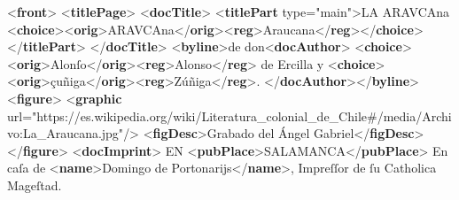 \documentclass[
]{book}
\newenvironment{Shaded}{\begin{snugshade}}{\end{snugshade}}
\newcommand{\KeywordTok}[1]{\textcolor[rgb]{0.13,0.29,0.53}{\textbf{#1}}}
\newcommand{\NormalTok}[1]{#1}
\newcommand{\OtherTok}[1]{\textcolor[rgb]{0.56,0.35,0.01}{#1}}
\newcommand{\StringTok}[1]{\textcolor[rgb]{0.31,0.60,0.02}{#1}}
\begin{document}
\begin{Shaded}
\begin{Highlighting}[]
\NormalTok{\textless{}}\KeywordTok{front}\NormalTok{\textgreater{}}
\NormalTok{  \textless{}}\KeywordTok{titlePage}\NormalTok{\textgreater{}}
\NormalTok{    \textless{}}\KeywordTok{docTitle}\NormalTok{\textgreater{}}
\NormalTok{      \textless{}}\KeywordTok{titlePart}\OtherTok{ type=}\StringTok{"main"}\NormalTok{\textgreater{}LA ARAVCAna \textless{}}\KeywordTok{choice}\NormalTok{\textgreater{}\textless{}}\KeywordTok{orig}\NormalTok{\textgreater{}ARAVCAna\textless{}/}\KeywordTok{orig}\NormalTok{\textgreater{}\textless{}}\KeywordTok{reg}\NormalTok{\textgreater{}Araucana\textless{}/}\KeywordTok{reg}\NormalTok{\textgreater{}\textless{}/}\KeywordTok{choice}\NormalTok{\textgreater{}}
\NormalTok{      \textless{}/}\KeywordTok{titlePart}\NormalTok{\textgreater{}}
\NormalTok{    \textless{}/}\KeywordTok{docTitle}\NormalTok{\textgreater{}}
\NormalTok{    \textless{}}\KeywordTok{byline}\NormalTok{\textgreater{}de don\textless{}}\KeywordTok{docAuthor}\NormalTok{\textgreater{}}
\NormalTok{    \textless{}}\KeywordTok{choice}\NormalTok{\textgreater{}\textless{}}\KeywordTok{orig}\NormalTok{\textgreater{}Alonſo\textless{}/}\KeywordTok{orig}\NormalTok{\textgreater{}\textless{}}\KeywordTok{reg}\NormalTok{\textgreater{}Alonso\textless{}/}\KeywordTok{reg}\NormalTok{\textgreater{} }
\NormalTok{    de Ercilla y \textless{}}\KeywordTok{choice}\NormalTok{\textgreater{}\textless{}}\KeywordTok{orig}\NormalTok{\textgreater{}çuñiga\textless{}/}\KeywordTok{orig}\NormalTok{\textgreater{}\textless{}}\KeywordTok{reg}\NormalTok{\textgreater{}Zúñiga\textless{}/}\KeywordTok{reg}\NormalTok{\textgreater{}.}
\NormalTok{    \textless{}/}\KeywordTok{docAuthor}\NormalTok{\textgreater{}\textless{}/}\KeywordTok{byline}\NormalTok{\textgreater{} }
\NormalTok{    \textless{}}\KeywordTok{figure}\NormalTok{\textgreater{}}
\NormalTok{      \textless{}}\KeywordTok{graphic}\OtherTok{ url=}\StringTok{"https://es.wikipedia.org/wiki/Literatura\_colonial\_de\_Chile\#/media/Archivo:La\_Araucana.jpg"}\NormalTok{/\textgreater{}}
\NormalTok{      \textless{}}\KeywordTok{figDesc}\NormalTok{\textgreater{}Grabado del Ángel Gabriel\textless{}/}\KeywordTok{figDesc}\NormalTok{\textgreater{}}
\NormalTok{    \textless{}/}\KeywordTok{figure}\NormalTok{\textgreater{}}
\NormalTok{    \textless{}}\KeywordTok{docImprint}\NormalTok{\textgreater{} }
\NormalTok{       EN \textless{}}\KeywordTok{pubPlace}\NormalTok{\textgreater{}SALAMANCA\textless{}/}\KeywordTok{pubPlace}\NormalTok{\textgreater{}}
\NormalTok{      En caſa de \textless{}}\KeywordTok{name}\NormalTok{\textgreater{}Domingo de Portonarijs\textless{}/}\KeywordTok{name}\NormalTok{\textgreater{}, Impreſſor de ſu Catholica Mageſtad.}

\end{Highlighting}
\end{Shaded}
\end{document}
